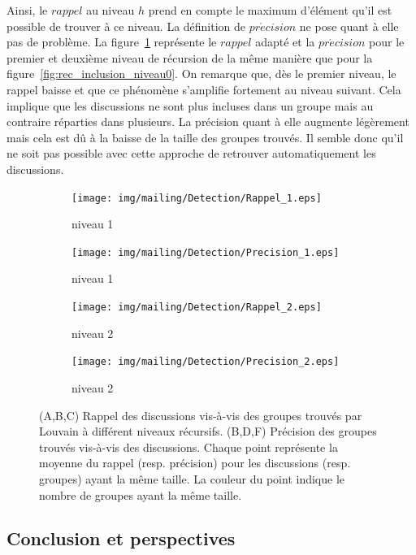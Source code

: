 Ainsi, le $rappel$ au niveau $h$ prend en compte le maximum d'élément qu'il est possible de trouver à ce niveau.
La définition de $pr\acute{e}cision$ ne pose quant à  elle pas de problème.
La figure~\ref{fig:rec_inclusion} représente le $rappel$ adapté et la $pr\acute{e}cision$ pour le premier et deuxième niveau de récursion de la même manière que pour la figure~\ref{fig:rec_inclusion_niveau0}.
On remarque que, dès le premier niveau, le rappel baisse et que ce phénomène s'amplifie fortement au niveau suivant.
Cela implique que les discussions ne sont plus incluses dans un groupe mais au contraire réparties dans plusieurs.
La précision quant à elle augmente légèrement mais cela est dû à la baisse de la taille des groupes trouvés.
Il semble donc qu'il ne soit pas possible avec cette approche de retrouver automatiquement les discussions.


\begin{figure} [h]
\centering

	\begin{subfigure}{0.45\textwidth}
		\texttt{[image: img/mailing/Detection/Rappel\_1.eps]}
		\caption{niveau 1}		
	\end{subfigure}
	\begin{subfigure}{0.45\textwidth}
		\texttt{[image: img/mailing/Detection/Precision\_1.eps]}
		\caption{niveau 1}		
	\end{subfigure}
	
	\begin{subfigure}{0.45\textwidth}
		\texttt{[image: img/mailing/Detection/Rappel\_2.eps]}
		\caption{niveau 2}		
	\end{subfigure}
	\begin{subfigure}{0.45\textwidth}
		\texttt{[image: img/mailing/Detection/Precision\_2.eps]}
		\caption{niveau 2}		
	\end{subfigure}

\caption{(A,B,C) Rappel des discussions vis-à-vis des groupes trouvés par Louvain à différent niveaux récursifs.
(B,D,F) Précision des groupes trouvés vis-à-vis des discussions.
Chaque point représente la moyenne du rappel (resp. précision) pour les discussions (resp. groupes) ayant la même taille.
La couleur du point indique le nombre de groupes ayant la même taille.
}
\label{fig:rec_inclusion}
\end{figure}

\subsection{Conclusion et perspectives}

